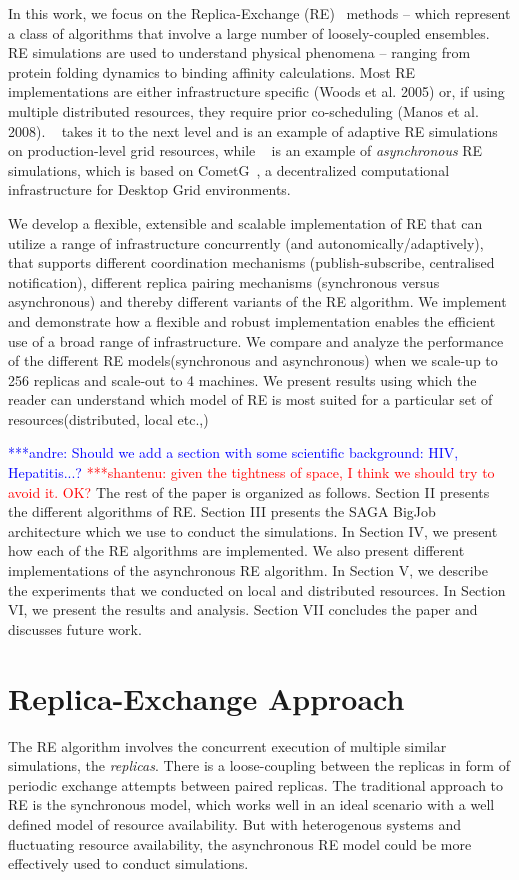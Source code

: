 \documentclass{rspublic}
\newcommand{\jhanote}[1]{ {\textcolor{red} { ***shantenu: #1 }}}
\newcommand{\alnote}[1]{ {\textcolor{blue} { ***andre: #1 }}}
\newcommand{\alnote}[1]{}
\newcommand{\jhanote}[1]{}
\begin{document}
In this work, we focus on the Replica-Exchange (RE)~\cite{hansmann,Sugita:1999rm} 
methods -- which represent a class of
algorithms that involve a large number of loosely-coupled ensembles.
RE simulations are used to understand physical phenomena -- ranging
from protein folding dynamics to binding affinity calculations. Most RE implementations are either infrastructure specific (Woods et al. 2005)
or, if using multiple distributed resources, they require prior co-scheduling
(Manos et al. 2008). ~\cite{Luckow:2008fp} takes it to the next level and is an example of adaptive RE simulations on production-level grid resources, while ~\cite{parashar_arepex} is an example of \emph{asynchronous} RE simulations, which is based on CometG~\cite{Li:2005:CSC:1090948.1091381}, a decentralized computational infrastructure for Desktop Grid environments.

We develop a flexible, extensible and scalable
implementation of RE that can utilize a range of infrastructure
concurrently (and autonomically/adaptively), that supports different
coordination mechanisms (publish-subscribe, centralised notification),
different replica pairing mechanisms (synchronous versus asynchronous)
and thereby different variants of the RE algorithm. We implement and
demonstrate how a flexible and robust implementation enables the
efficient use of a broad range of infrastructure. We compare and analyze the performance of the different RE models(synchronous and asynchronous) when we scale-up to 256 replicas and scale-out to 4 machines. 
We present results using which the reader can understand which model of RE is most suited for a particular set of resources(distributed, local etc.,)

\alnote{Should we add a section with some scientific background: HIV,
  Hepatitis...?}  \jhanote{given the tightness of space, I think we
  should try to avoid it. OK?} The rest of the paper is organized as
follows. Section II presents the different algorithms of RE. Section
III presents the SAGA BigJob architecture which we use to conduct the
simulations. In Section IV, we present how each of the RE algorithms
are implemented. We also present different implementations of the
asynchronous RE algorithm. In Section V, we describe the experiments
that we conducted on local and distributed resources. In Section VI,
we present the results and analysis. Section VII concludes the paper
and discusses future work.

\section{Replica-Exchange Approach}
\label{sec:repex-approach}
The RE algorithm involves the concurrent execution of multiple similar
simulations, the \emph{replicas}.  There is a loose-coupling between
the replicas in form of periodic exchange attempts between paired
replicas. The traditional approach to RE is the synchronous model, which works well in an ideal scenario with a well defined model of resource availability. But with heterogenous systems and fluctuating resource availability, the asynchronous RE model could be more effectively used to conduct simulations.
\end{document}
